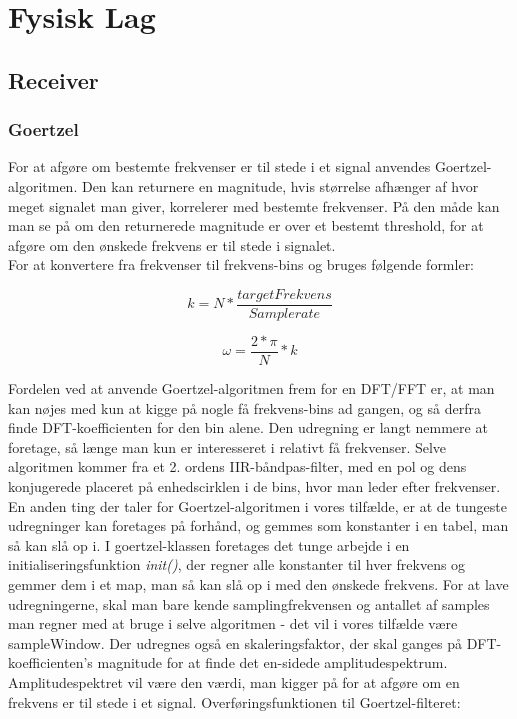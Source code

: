 \section{Fysisk Lag}

\subsection{Receiver}

\subsubsection{Goertzel}

For at afgøre om bestemte frekvenser er til stede i et signal anvendes Goertzel-algoritmen. Den kan returnere en magnitude, hvis størrelse afhænger af hvor meget signalet man giver, korrelerer med bestemte frekvenser. På den måde kan man se på om den returnerede magnitude er over et bestemt threshold, for at afgøre om den ønskede frekvens er til stede i signalet.\\

For at konvertere fra frekvenser til frekvens-bins og  bruges følgende formler:

\noindent\begin{minipage}{.5\linewidth}
\begin{equation}
  k=N*\dfrac{targetFrekvens}{Samplerate}
\end{equation}
\end{minipage}%
\begin{minipage}{.5\linewidth}
\begin{equation}
  \omega = \dfrac{2*\pi}{N}*k
\end{equation}
\end{minipage}


Fordelen ved at anvende Goertzel-algoritmen frem for en DFT/FFT er, at man kan nøjes med kun at kigge på nogle få frekvens-bins ad gangen, og så derfra finde DFT-koefficienten for den bin alene. Den udregning er langt nemmere at foretage, så længe man kun er interesseret i relativt få frekvenser. Selve algoritmen kommer fra et 2. ordens IIR-båndpas-filter, med en pol og dens konjugerede placeret på enhedscirklen i de bins, hvor man leder efter frekvenser. En anden ting der taler for Goertzel-algoritmen i vores tilfælde, er at de tungeste udregninger kan foretages på forhånd, og gemmes som konstanter i en tabel, man så kan slå op i. I goertzel-klassen foretages det tunge arbejde i en initialiseringsfunktion \textit{init()}, der regner alle konstanter til hver frekvens og gemmer dem i et map, man så kan slå op i med den ønskede frekvens. For at lave udregningerne, skal man bare kende samplingfrekvensen og antallet af samples man regner med at bruge i selve algoritmen - det vil i vores tilfælde være sampleWindow. Der udregnes også en skaleringsfaktor, der skal ganges på DFT-koefficienten's magnitude for at finde det en-sidede amplitudespektrum. Amplitudespektret vil være den værdi, man kigger på for at afgøre om en frekvens er til stede i et signal. 
Overføringsfunktionen til Goertzel-filteret:



